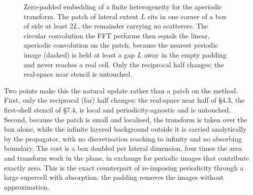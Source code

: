 \documentclass[11pt,a4paper]{article}
\begin{document}
\begin{figure}[h]
\centering
{}
\caption{Zero-padded embedding of a finite heterogeneity for the aperiodic transform. The patch
of lateral extent $L$ sits in one corner of a box of side at least $2L$, the remainder carrying
no scatterers. The circular convolution the FFT performs then equals the linear, aperiodic
convolution on the patch, because the nearest periodic image (dashed) is held at least a gap $L$
away in the empty padding and never reaches a real cell. Only the reciprocal half changes; the
real-space near stencil is untouched.}
\label{fig:padding}
\end{figure}

Two points make this the natural update rather than a patch on the method. First, only the
reciprocal (far) half changes: the real-space near half of \S4.3, the first-shell stencil of
\S7.4, is local and periodicity-agnostic and is untouched. Second, because the patch is small
and localised, the transform is taken over the box alone, while the infinite layered background
outside it is carried analytically by the propagator, with no discretisation reaching to
infinity and no absorbing boundary. The cost is a box doubled per lateral dimension, four times
the area and transform work in the plane, in exchange for periodic images that contribute
exactly zero. This is the exact counterpart of re-imposing periodicity through a large supercell
with absorption: the padding removes the images without approximation.
\end{document}
